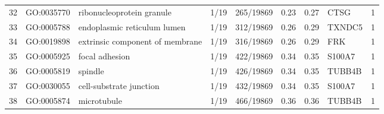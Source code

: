 \begin{table}[ht]
\begin{tabular}{rllllrrlr}
  32 & GO:0035770 & ribonucleoprotein granule & 1/19 & 265/19869 & 0.23 & 0.27 & CTSG &   1 \\ 
  33 & GO:0005788 & endoplasmic reticulum lumen & 1/19 & 312/19869 & 0.26 & 0.29 & TXNDC5 &   1 \\ 
  34 & GO:0019898 & extrinsic component of membrane & 1/19 & 316/19869 & 0.26 & 0.29 & FRK &   1 \\ 
  35 & GO:0005925 & focal adhesion & 1/19 & 422/19869 & 0.34 & 0.35 & S100A7 &   1 \\ 
  36 & GO:0005819 & spindle & 1/19 & 426/19869 & 0.34 & 0.35 & TUBB4B &   1 \\ 
  37 & GO:0030055 & cell-substrate junction & 1/19 & 432/19869 & 0.34 & 0.35 & S100A7 &   1 \\ 
  38 & GO:0005874 & microtubule & 1/19 & 466/19869 & 0.36 & 0.36 & TUBB4B &   1 \\ 
   \hline
\end{tabular}
\end{table}

